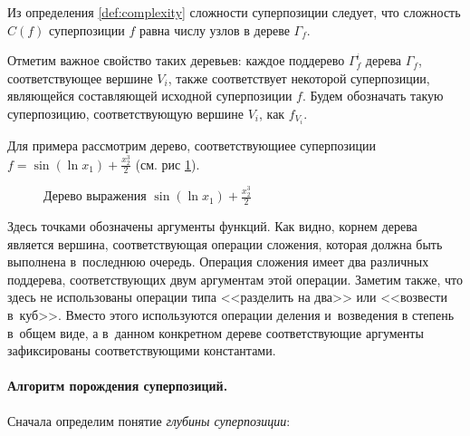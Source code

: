 \documentclass[12pt,a4paper]{article}
\begin{document}
Из определения \ref{def:complexity} сложности суперпозиции
следует, что сложность $C(f)$ суперпозиции $f$ равна числу узлов в
дереве $\Gamma_f$.

Отметим важное свойство таких деревьев: каждое поддерево $\Gamma_f^i$
дерева $\Gamma_f$, соответствующее вершине $V_i$, также соответствует
некоторой суперпозиции, являющейся составляющей исходной суперпозиции $f$.
Будем обозначать такую суперпозицию, соответствующую вершине $V_i$, как
$f_{V_i}$.

Для примера рассмотрим дерево, соответствующиее суперпозиции
$f = \sin (\ln x_1) + \frac{x_2^3}{2}$ (см. рис \ref{fig:expr_tree_example}).

\begin{figure}[h]
  \centering
  \caption{Дерево выражения $\sin (\ln x_1) + \frac{x_2^3}{2}$}
  \label{fig:expr_tree_example}
\end{figure}

Здесь точками обозначены аргументы функций. Как видно, корнем дерева является
вершина, соответствующая операции сложения, которая должна быть выполнена
в~последнюю очередь. Операция сложения имеет два различных поддерева,
соответствующих двум аргументам этой операции. Заметим также, что здесь не
использованы операции типа <<разделить на два>> или <<возвести в~куб>>.
Вместо этого используются операции деления и~возведения в степень в~общем
виде, а в~данном конкретном дереве соответствующие аргументы зафиксированы
соответствующими константами.

\paragraph{Алгоритм порождения суперпозиций.} Сначала определим понятие
\emph{глубины суперпозиции}:
\end{document}
